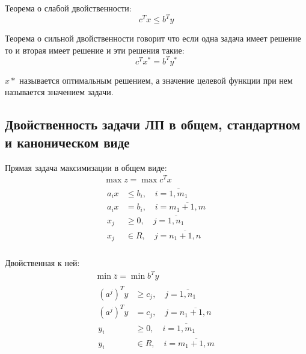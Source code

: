 \documentclass[a4paper,article,14pt]{extarticle}
\begin{document}
Теорема о слабой двойственности:
\begin{equation}
    c^T x \le b^T y
\end{equation}

Теорема о сильной двойственности говорит что если одна задача имеет решение то и вторая имеет решение и эти решения такие:
\begin{equation}
    c^T x^* = b^T y^*
\end{equation}

\(x*\) называется оптимальным решением, а значение целевой функции при нем называется значением задачи.

\subsection{Двойственность задачи ЛП в общем, стандартном и каноническом виде}

Прямая задача максимизации в общем виде:
\begin{equation}
    \begin{gathered}
        \max z = \max c^T x \\
        \begin{aligned}
            a_ix & \le b_i, \quad i = \overline{1, m_1} \\
            a_ix & = b_i, \quad i = \overline{m_1 + 1, m} \\
            x_j & \ge 0, \quad j = \overline{1, n_1} \\
            x_j & \in R, \quad j = \overline{n_1 + 1, n} \\
        \end{aligned}
    \end{gathered}
\end{equation}

Двойственная к ней:
\begin{equation}
    \begin{gathered}
    \min \overline z = \min b^T y \\
        \begin{aligned}
            (a^j)^Ty & \ge c_j, \quad j = \overline{1, n_1} \\
            (a^j)^Ty & = c_j, \quad j = \overline{n_1 + 1, n} \\
            y_i & \ge 0, \quad i = \overline{1, m_1} \\
            y_i & \in R, \quad i = \overline{m_1 + 1, m} \\
        \end{aligned}
    \end{gathered}
\end{equation}
\end{document}
